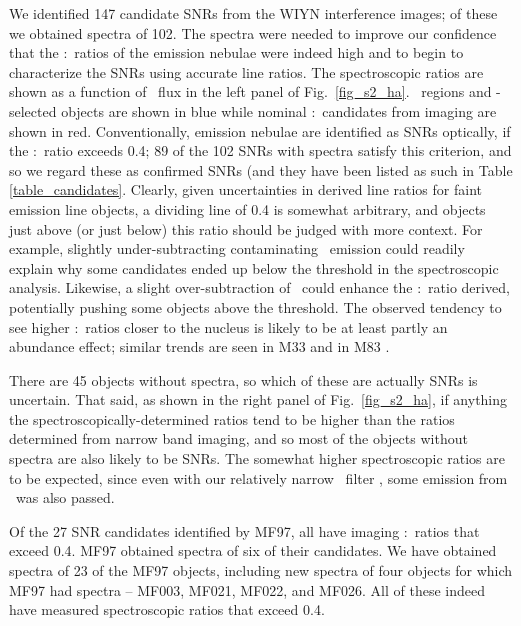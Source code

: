 We identified 147 candidate SNRs from the WIYN interference images; of these we obtained spectra of 102. The spectra were needed to improve our confidence that the \sii:\ha\ ratios of the emission nebulae were indeed high and to begin to characterize the SNRs using accurate line ratios.  The spectroscopic ratios are shown as a function of \ha\ flux in the left panel of  Fig.\ \ref{fig_s2_ha}. \hii\ regions and \oiii-selected objects are shown in blue while nominal \sii:\ha\ candidates from imaging are shown in red.   Conventionally, emission nebulae are identified as SNRs optically, if the \sii:\ha\ ratio exceeds 0.4; 89 of the 102 SNRs with spectra satisfy this criterion, and so we regard these as confirmed SNRs (and they have been listed as such in Table \ref{table_candidates}. Clearly, given uncertainties in derived line ratios for faint emission line objects, a dividing line of 0.4 is somewhat arbitrary, and objects just above (or just below) this ratio should be judged with more context.  For example, slightly under-subtracting contaminating \ha\ emission could readily explain why some candidates ended up below the threshold in the spectroscopic analysis. Likewise, a slight over-subtraction of \ha\ could enhance the \sii:\ha\ ratio derived, potentially pushing some objects above the threshold.  The observed tendency to see higher \sii:\ha\ ratios closer to the nucleus is likely to be at least partly an abundance effect; similar trends are seen in M33 \citep{long18} and in M83 \citep{winkler17}. 

There are 45 objects without spectra, so which of these are actually SNRs is uncertain.  That said, as shown in the right panel of Fig.\ \ref{fig_s2_ha}, if anything the spectroscopically-determined ratios tend to be higher than the ratios determined from narrow band imaging, and so most of the objects without spectra are also likely to be SNRs.  The somewhat higher spectroscopic ratios are to be expected, since even with our relatively narrow \ha\ filter , some emission from \nii\ was  also passed.   

Of the 27 SNR candidates identified by MF97, all have imaging \sii:\ha\ ratios that exceed 0.4. MF97 obtained spectra of six of their candidates.  We have obtained spectra of 23 of the MF97 objects, including new spectra of four objects for which MF97 had spectra -- MF003, MF021, MF022, and MF026.  All of these indeed have measured spectroscopic ratios that exceed 0.4.




